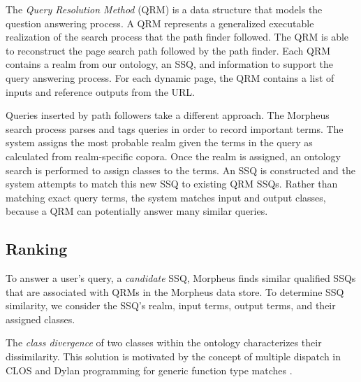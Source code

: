 \begin{table}[h]
	\caption{Example SSQ model}
	\label{tab:ssq_example}
\end{table}


The \emph{Query Resolution Method} (QRM) is a data structure that models the question answering process. A QRM represents a generalized executable realization of the search process that the path finder followed. The QRM is able to reconstruct the page search path followed by the path finder. Each QRM contains a realm from our ontology, an SSQ, and information to support the query answering process. For each dynamic page, the QRM contains a list of inputs and reference outputs from the URL.


Queries inserted by path followers take a different approach. The Morpheus search process parses and tags queries in order to record important terms. The system assigns the most probable realm given the terms in the query as calculated from realm-specific copora. Once the realm is assigned, an ontology search is performed to assign classes to the terms. An SSQ is constructed and the system attempts to match this new SSQ to existing QRM SSQs. Rather than matching exact query terms, the system matches input and output classes, because a QRM can potentially answer many similar queries.


\subsection{Ranking} 
\label{sec:qrm_ranking}

To answer a user's query, a \emph{candidate} SSQ, Morpheus finds similar qualified SSQs that are associated with QRMs in the Morpheus data store.  To determine SSQ similarity, we consider the SSQ's realm, input terms, output terms, and their assigned classes. 

The \emph{class divergence} of two classes within the ontology characterizes their dissimilarity.  This solution is motivated by the concept of multiple dispatch in CLOS and Dylan programming for generic function type matches \cite{Barrett1996}. 

